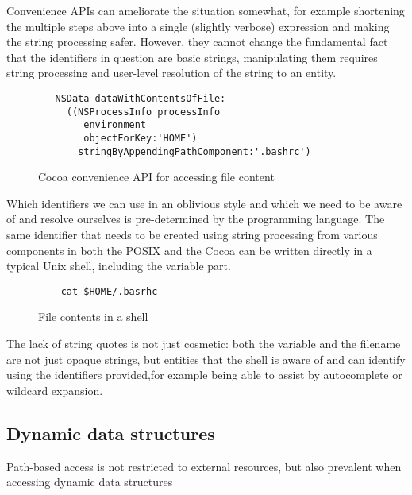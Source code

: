 \documentclass[preprint,authoryear]{acm_proc_article-sp}
\begin{document}
Convenience APIs can ameliorate the situation somewhat, for example shortening 
the multiple steps above into a single (slightly verbose) expression and making the
string processing safer.  However, they cannot
change the fundamental fact that the identifiers in question are basic strings,
manipulating them requires string processing and user-level resolution of the
string to an entity.

\begin{figure}[htbp]
\begin{center}
\begin{verbatim}
   NSData dataWithContentsOfFile:
     ((NSProcessInfo processInfo
        environment 
        objectForKey:'HOME') 
       stringByAppendingPathComponent:'.bashrc')

\end{verbatim}
\caption{Cocoa convenience API for accessing file content}
\label{cocoa-file-contents}
\end{center}
\end{figure}


Which identifiers we can use in an oblivious style and which we need to
be aware of and resolve ourselves is pre-determined by the programming
language.
The same identifier that needs to be created using string processing from various
components in both the POSIX and the Cocoa can be written directly in a typical
Unix shell, including the variable part.

\begin{figure}[htbp]
\begin{center}
\begin{verbatim}
	cat $HOME/.basrhc
\end{verbatim}
\caption{File contents in a shell}
\label{sh-file-contents}
\end{center}
\end{figure}

The lack of string quotes is not just cosmetic: both the variable and the filename
are not just opaque strings, but entities that the shell is aware of and can identify
using the identifiers provided,for example being able to assist by autocomplete 
or wildcard expansion.



\subsection{Dynamic data structures}

Path-based access is not restricted to external resources, but also
prevalent when accessing dynamic data structures
\end{document}
